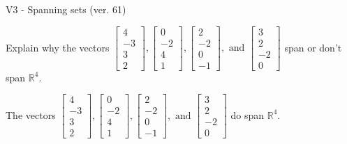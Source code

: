 \begin{exercise}
  \begin{exerciseTitle}V3 - Spanning sets (ver. 61)\end{exerciseTitle}
  \begin{exerciseStatement}
    Explain why the vectors \(\left[\begin{array}{r}
4 \\
-3 \\
3 \\
2
\end{array}\right] , \left[\begin{array}{r}
0 \\
-2 \\
4 \\
1
\end{array}\right] , \left[\begin{array}{r}
2 \\
-2 \\
0 \\
-1
\end{array}\right] , \text{ and } \left[\begin{array}{r}
3 \\
2 \\
-2 \\
0
\end{array}\right]\) span or don't span \(\mathbb{R}^4\). 
	


  \end{exerciseStatement}
  \begin{exerciseAnswer}
   The vectors \(\left[\begin{array}{r}
4 \\
-3 \\
3 \\
2
\end{array}\right] , \left[\begin{array}{r}
0 \\
-2 \\
4 \\
1
\end{array}\right] , \left[\begin{array}{r}
2 \\
-2 \\
0 \\
-1
\end{array}\right] , \text{ and } \left[\begin{array}{r}
3 \\
2 \\
-2 \\
0
\end{array}\right]\) 
  	 do  
	span \(\mathbb{R}^4\).
  


  \end{exerciseAnswer}
\end{exercise}